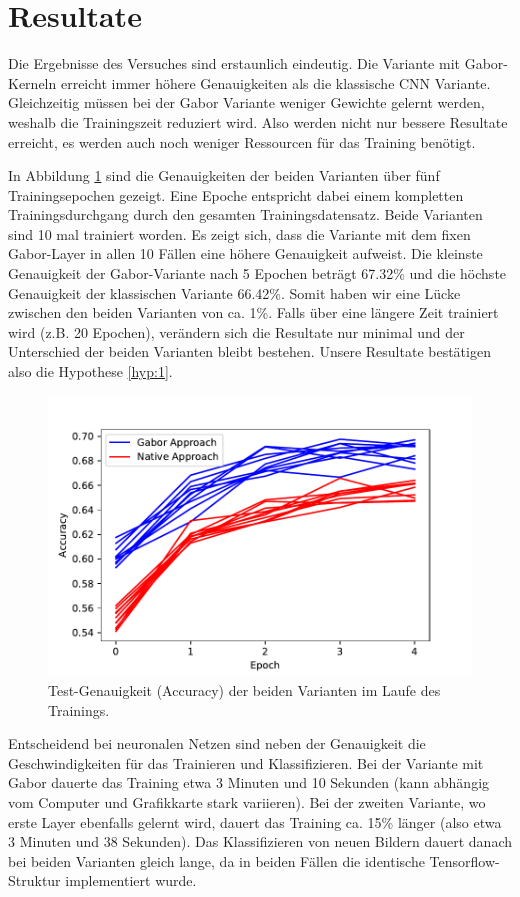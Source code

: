 \section{Resultate}

Die Ergebnisse des Versuches sind erstaunlich eindeutig.
Die Variante mit Gabor-Kerneln erreicht immer höhere Genauigkeiten als die klassische CNN Variante.
Gleichzeitig müssen bei der Gabor Variante weniger Gewichte gelernt werden, weshalb die Trainingszeit reduziert wird.
Also werden nicht nur bessere Resultate erreicht, es werden auch noch weniger Ressourcen für das Training benötigt.

In Abbildung \ref{fig:acc} sind die Genauigkeiten der beiden Varianten über fünf Trainingsepochen gezeigt.
Eine Epoche entspricht dabei einem kompletten Trainingsdurchgang durch den gesamten Trainingsdatensatz.
Beide Varianten sind 10 mal trainiert worden. 
Es zeigt sich, dass die Variante mit dem fixen Gabor-Layer in allen 10 Fällen eine höhere Genauigkeit aufweist.
Die kleinste Genauigkeit der Gabor-Variante nach 5 Epochen beträgt 67.32\% und die höchste Genauigkeit der klassischen Variante 66.42\%.
Somit haben wir eine Lücke zwischen den beiden Varianten von ca. 1\%.
Falls über eine längere Zeit trainiert wird (z.B. 20 Epochen), verändern sich die Resultate nur minimal und der Unterschied der beiden Varianten bleibt bestehen.
Unsere Resultate bestätigen also die Hypothese \ref{hyp:1}.

\begin{figure}
	\centering
	\includegraphics[width=0.7\linewidth]{./papers/visuell/images/accuracy}
	\caption{Test-Genauigkeit (Accuracy) der beiden Varianten im Laufe des Trainings.}
	\label{fig:acc}
\end{figure}

Entscheidend bei neuronalen Netzen sind neben der Genauigkeit die Geschwindigkeiten für das Trainieren und Klassifizieren.
Bei der Variante mit Gabor dauerte das Training etwa 3 Minuten und 10 Sekunden (kann abhängig vom Computer und Grafikkarte stark variieren).
Bei der zweiten Variante, wo erste Layer ebenfalls gelernt wird, dauert das Training ca. 15\% länger (also etwa 3 Minuten und 38 Sekunden).
Das Klassifizieren von neuen Bildern dauert danach bei beiden Varianten gleich lange, da in beiden Fällen die identische Tensorflow-Struktur implementiert wurde.


